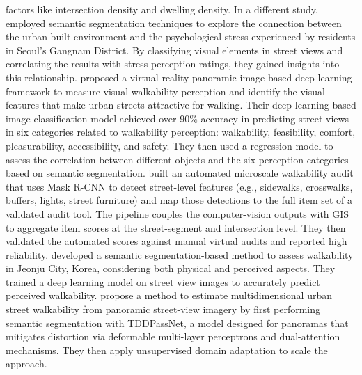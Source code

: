 \documentclass[11pt]{article}
\begin{document}
factors like intersection density and dwelling density.  In a different study, \citet{han2022measuring} employed semantic segmentation techniques to explore the connection between the urban built environment and the psychological stress experienced by residents in Seoul’s Gangnam District. By classifying visual elements in street views and correlating the results with stress perception ratings, they gained insights into this relationship. \citet{li2022measuring} proposed a virtual reality panoramic image-based deep learning framework to measure visual walkability perception and identify the visual features that make urban streets attractive for walking. Their deep learning-based image classification model achieved over 90\% accuracy in predicting street views in six categories related to walkability perception: walkability, feasibility, comfort, pleasurability, accessibility, and safety. They then used a regression model to assess the correlation between different objects and the six perception categories based on semantic segmentation. \citet{koo2022development} built an automated microscale walkability audit that uses Mask R-CNN to detect street-level features (e.g., sidewalks, crosswalks, buffers, lights, street furniture) and map those detections to the full item set of a validated audit tool. The pipeline couples the computer-vision outputs with GIS to aggregate item scores at the street-segment and intersection level. They then validated the automated scores against manual virtual audits and reported high reliability. \citet{kang2023assessment} developed a semantic segmentation-based method to assess walkability in Jeonju City, Korea, considering both physical and perceived aspects. They trained a deep learning model on street view images to accurately predict perceived walkability. \citet{li2024estimation} propose a method to estimate multidimensional urban street walkability from panoramic street-view imagery by first performing semantic segmentation with TDDPassNet, a model designed for panoramas that mitigates distortion via deformable multi-layer perceptrons and dual-attention mechanisms. They then apply unsupervised domain adaptation to scale the approach. 
\end{document}
